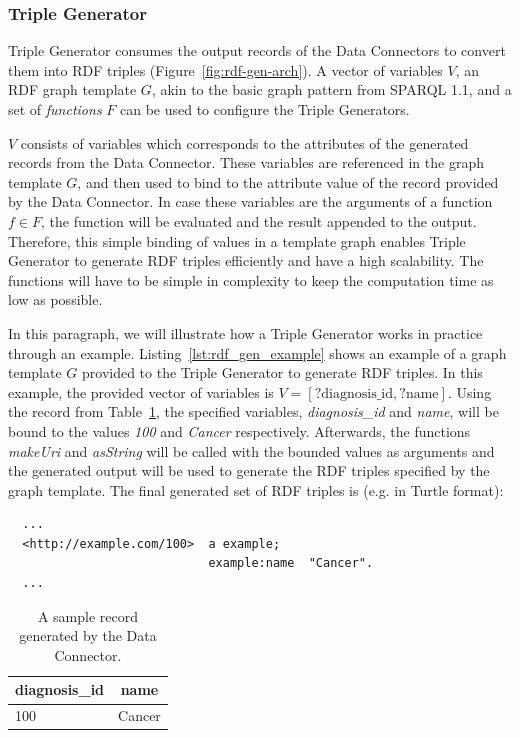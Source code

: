 \subsubsection{Triple Generator}
Triple Generator consumes the output records 
of the Data Connectors to convert them into RDF triples (Figure~\ref{fig:rdf-gen-arch}). A vector of variables $V$, an RDF 
graph template $G$, akin to the basic graph pattern from SPARQL 1.1, and a 
set of \emph{functions} $F$ can be used to configure the Triple Generators. 

$V$ consists of variables which corresponds to the attributes of the
generated records from the Data Connector. These variables are referenced 
in the graph template $G$, and then used to 
bind to the attribute value of the record provided by the Data Connector. 
In case these variables are the arguments of a function $f \in F$, the function will 
be evaluated and the result appended to the output. Therefore, 
this simple binding of values in a template graph enables Triple Generator to 
generate RDF triples efficiently and have a high scalability.
The functions will have to be simple in complexity to keep the computation 
time as low as possible.


In this paragraph, we will illustrate how a Triple Generator works
in practice through an example.  
Listing~\ref{lst:rdf_gen_example} shows an example of a graph template $G$ provided to 
the Triple Generator to generate RDF triples. In this example, the provided vector 
of variables is $V = [\textrm{?diagnosis\_id}, \textrm{?name} ]$. Using the record 
from Table~\ref{tab:rdf_gen_sample_record}, the specified variables,
\emph{diagnosis\_id} and \emph{name}, will be bound to the values \emph{100} and 
\emph{Cancer} respectively. Afterwards, the functions \emph{makeUri} and \emph{asString} will 
be called with the bounded values as arguments and the generated 
output will be used to generate the RDF triples specified by 
the graph template. 
The final generated set of RDF triples is (e.g. in Turtle format): 

\begin{lstlisting}
  ... 
  <http://example.com/100>  a example; 
                            example:name  "Cancer". 
  ...
\end{lstlisting}


\begin{table}[!htbp]
  \centering
  \begin{tabular}{l|l}
  \multicolumn{1}{c|}{\textbf{diagnosis\_id}} & \multicolumn{1}{c}{\textbf{name}} \\ \hline
  100                                 & Cancer                    
  \end{tabular}
  \caption{A sample record generated by the Data Connector.}
  \label{tab:rdf_gen_sample_record}
  \end{table}

